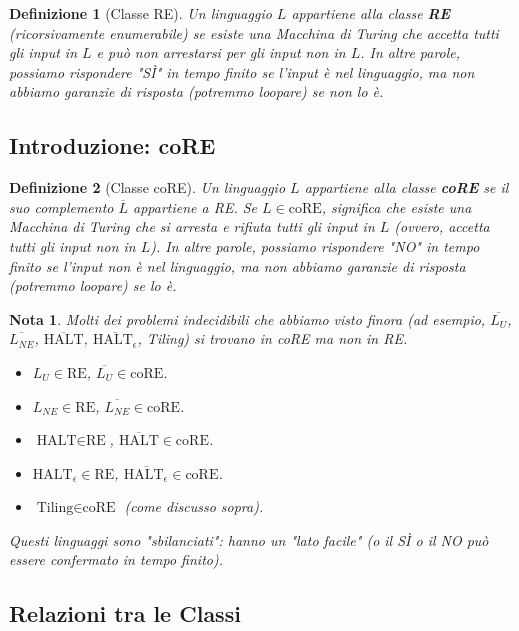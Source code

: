 \documentclass[a4paper]{article}
\newtheorem{definition}{Definizione}
\newtheorem{remark}{Nota}
\begin{document}
\begin{definition}[Classe RE]
Un linguaggio $L$ appartiene alla classe \textbf{RE} (ricorsivamente enumerabile) se esiste una Macchina di Turing che accetta tutti gli input in $L$ e può non arrestarsi per gli input non in $L$. In altre parole, possiamo rispondere "SÌ" in tempo finito se l'input è nel linguaggio, ma non abbiamo garanzie di risposta (potremmo loopare) se non lo è.
\end{definition}

\subsection{Introduzione: coRE}
\begin{definition}[Classe coRE]
Un linguaggio $L$ appartiene alla classe \textbf{coRE} se il suo complemento $\overline{L}$ appartiene a RE.
Se $L \in \text{coRE}$, significa che esiste una Macchina di Turing che si arresta e rifiuta tutti gli input in $L$ (ovvero, accetta tutti gli input non in $L$). In altre parole, possiamo rispondere "NO" in tempo finito se l'input non è nel linguaggio, ma non abbiamo garanzie di risposta (potremmo loopare) se lo è.
\end{definition}

\begin{remark}
Molti dei problemi indecidibili che abbiamo visto finora (ad esempio, $\overline{L_U}$, $\overline{L_{NE}}$, $\overline{\text{HALT}}$, $\overline{\text{HALT}_\epsilon}$, Tiling) si trovano in coRE ma non in RE.
\begin{itemize}
    \item $L_U \in \text{RE}$, $\overline{L_U} \in \text{coRE}$.
    \item $L_{NE} \in \text{RE}$, $\overline{L_{NE}} \in \text{coRE}$.
    \item $\text{HALT} \in \text{RE}$, $\overline{\text{HALT}} \in \text{coRE}$.
    \item $\text{HALT}_\epsilon \in \text{RE}$, $\overline{\text{HALT}_\epsilon} \in \text{coRE}$.
    \item $\text{Tiling} \in \text{coRE}$ (come discusso sopra).
\end{itemize}
Questi linguaggi sono "sbilanciati": hanno un "lato facile" (o il SÌ o il NO può essere confermato in tempo finito).
\end{remark}

\subsection{Relazioni tra le Classi}
\end{document}
